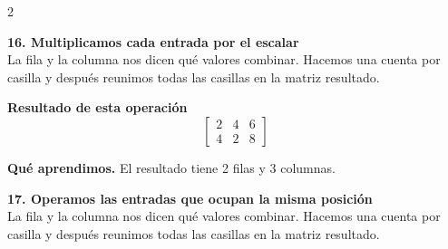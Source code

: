 \documentclass[11pt,a4paper,landscape]{article}
\begin{document}
\begin{multicols*}{2}
\noindent\begin{minipage}{\linewidth}\textbf{16. Multiplicamos cada entrada por el escalar}\\[2pt]La fila y la columna nos dicen qué valores combinar. Hacemos una cuenta por casilla y después reunimos todas las casillas en la matriz resultado.
\par{}\par\smallskip
\par\smallskip \textbf{Resultado de esta operación}\[\begin{bmatrix}2 & 4 & 6\\4 & 2 & 8\end{bmatrix}\]
\par\smallskip\textbf{Qué aprendimos.} El resultado tiene 2 filas y 3 columnas.
\end{minipage}\par\medskip
\noindent\begin{minipage}{\linewidth}\textbf{17. Operamos las entradas que ocupan la misma posición}\\[2pt]La fila y la columna nos dicen qué valores combinar. Hacemos una cuenta por casilla y después reunimos todas las casillas en la matriz resultado.
\par{}\par\smallskip

\end{minipage}
\end{multicols*}
\end{document}

